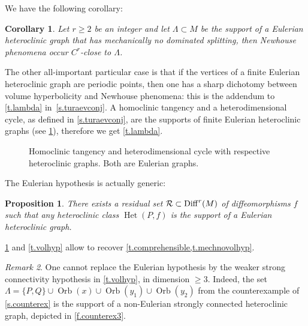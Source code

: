 \documentclass[11pt, a4paper]{amsart}
\theoremstyle{plain}
\newtheorem{proposition}{Proposition}[section]        %
\newtheorem{corollary}{Corollary}[theorem]
\theoremstyle{definition}
\theoremstyle{remark}
\newtheorem{remark}[proposition]{Remark}
\numberwithin{equation}{section}         %
\DeclareMathOperator{\Diff}{{Diff}}
\def\Diff{\operatorname{Diff}}
\def\Orb{\operatorname{Orb}}
\def\Het{\operatorname{Het}}
\begin{document}
We have the following corollary:

\begin{corollary}\label{c.homcor}
 Let $r\geq 2$ be an integer and let $\Lambda\subset M$ be the support of a Eulerian heteroclinic graph that has mechanically no dominated splitting, then Newhouse phenomena occur $C^r$-close to $\Lambda$.
\end{corollary}

The other all-important particular case is that if the vertices of a finite Eulerian heteroclinic graph are periodic points, then one has a sharp dichotomy between volume hyperbolicity and Newhouse phenomena: this is the addendum to \cref{t.lambda} in~\cref{s.turaevconj}. A homoclinic tangency and a heterodimensional cycle, as defined in \cref{s.turaevconj}, are the supports of finite Eulerian heteroclinic graphs (see \cref{f.graphecycletangence}), therefore we get \cref{t.lambda}.


\begin{figure}%
\begin{center}
\def\svgwidth{200pt}           %

\end{center}
\caption{\small Homoclinic tangency and heterodimensional cycle with respective heteroclinic graphs. Both are Eulerian graphs.}
\label{f.graphecycletangence}
\end{figure} 


The Eulerian hypothesis is actually generic:

\begin{proposition}\label{p.geneulerian}
There exists a residual set $\cR\subset \Diff^r(M)$ of diffeomorphisms $f$ such that any heteroclinic class $\Het(P,f)$ is the support of a Eulerian heteroclinic graph. 
\end{proposition}

\cref{p.geneulerian} and \cref{t.volhyp} allow to recover \cref{t.comprehensible,t.mechnovolhyp}.

\begin{remark}One cannot replace the Eulerian hypothesis by the weaker strong connectivity hypothesis in  \cref{t.volhyp}, in dimension $\geq 3$. 
Indeed, the set $\Lambda=\{P,Q\}\cup \Orb(x)\cup \Orb(y_1)\cup \Orb(y_2)$ from the counterexample of \cref{s.counterex} is the support of a non-Eulerian strongly connected heteroclinic graph, depicted in \cref{f.counterex3}.
\end{remark}
\end{document}
